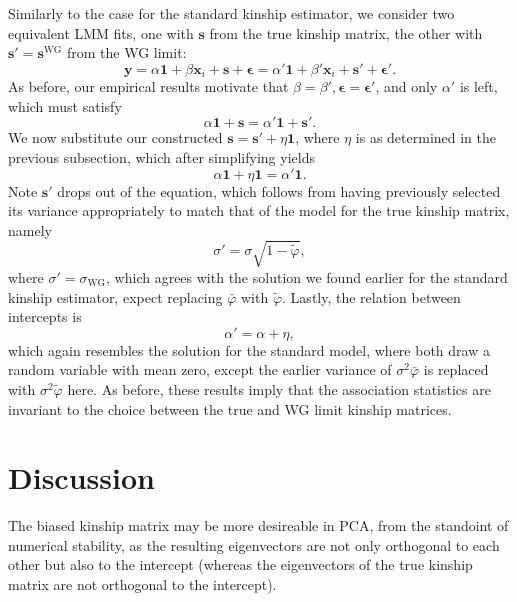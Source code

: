 \documentclass[11pt]{article}
\begin{document}
Similarly to the case for the standard kinship estimator, we consider two equivalent LMM fits, one with $\mathbf{s}$ from the true kinship matrix, the other with $\mathbf{s}' = \mathbf{s}^\text{WG}$ from the WG limit:
$$
\mathbf{y}
=
\alpha \mathbf{1} + \beta \mathbf{x}_i + \mathbf{s} + \boldsymbol{\epsilon}
=
\alpha' \mathbf{1} + \beta' \mathbf{x}_i + \mathbf{s}' + \boldsymbol{\epsilon}'
.
$$
As before, our empirical results motivate that $\beta = \beta', \boldsymbol{\epsilon} = \boldsymbol{\epsilon}'$, and only $\alpha'$ is left, which must satisfy
$$
\alpha \mathbf{1} + \mathbf{s}
=
\alpha' \mathbf{1} + \mathbf{s}'
.
$$
We now substitute our constructed $\mathbf{s} = \mathbf{s}' + \eta \mathbf{1}$, where $\eta$ is as determined in the previous subsection, which after simplifying yields
$$
\alpha \mathbf{1} + \eta \mathbf{1}
=
\alpha' \mathbf{1}
.
$$
Note $\mathbf{s}'$ drops out of the equation, which follows from having previously selected its variance appropriately to match that of the model for the true kinship matrix, namely
$$
\sigma' = \sigma \sqrt{ 1 - \tilde{\varphi} },
$$
where $\sigma' = \sigma_\text{WG}$, which agrees with the solution we found earlier for the standard kinship estimator, expect replacing $\bar{\varphi}$ with $\tilde{\varphi}$.
Lastly, the relation between intercepts is
$$
\alpha' = \alpha + \eta,
$$
which again resembles the solution for the standard model, where both draw a random variable with mean zero, except the earlier variance of $\sigma^2 \bar{\varphi}$ is replaced with $\sigma^2 \tilde{\varphi}$ here.
As before, these results imply that the association statistics are invariant to the choice between the true and WG limit kinship matrices.





\section{Discussion}

The biased kinship matrix may be more desireable in PCA, from the standoint of numerical stability, as the resulting eigenvectors are not only orthogonal to each other but also to the intercept (whereas the eigenvectors of the true kinship matrix are not orthogonal to the intercept).
\end{document}
